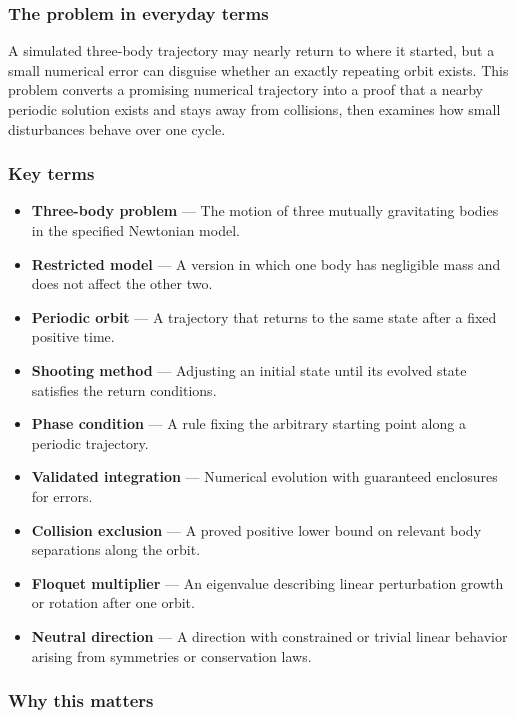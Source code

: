 \documentclass[
  11pt,
]{article}
\begin{document}
\subsubsection{The problem in everyday terms}

A simulated three-body trajectory may nearly return to where it started,
but a small numerical error can disguise whether an exactly repeating
orbit exists. This problem converts a promising numerical trajectory
into a proof that a nearby periodic solution exists and stays away from
collisions, then examines how small disturbances behave over one cycle.

\subsubsection{Key terms}

\begin{itemize}
\item
  \textbf{Three-body problem} --- The motion of three mutually
  gravitating bodies in the specified Newtonian model.
\item
  \textbf{Restricted model} --- A version in which one body has
  negligible mass and does not affect the other two.
\item
  \textbf{Periodic orbit} --- A trajectory that returns to the same
  state after a fixed positive time.
\item
  \textbf{Shooting method} --- Adjusting an initial state until its
  evolved state satisfies the return conditions.
\item
  \textbf{Phase condition} --- A rule fixing the arbitrary starting
  point along a periodic trajectory.
\item
  \textbf{Validated integration} --- Numerical evolution with guaranteed
  enclosures for errors.
\item
  \textbf{Collision exclusion} --- A proved positive lower bound on
  relevant body separations along the orbit.
\item
  \textbf{Floquet multiplier} --- An eigenvalue describing linear
  perturbation growth or rotation after one orbit.
\item
  \textbf{Neutral direction} --- A direction with constrained or trivial
  linear behavior arising from symmetries or conservation laws.
\end{itemize}

\subsubsection{Why this matters}
\end{document}
